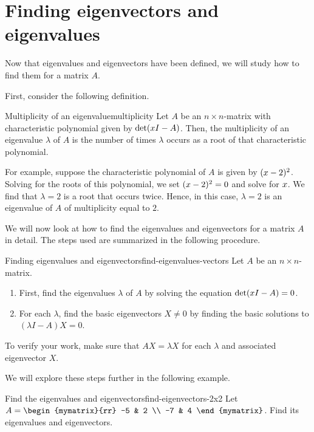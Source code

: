 \section{Finding eigenvectors and eigenvalues}

Now that eigenvalues and eigenvectors have been defined, we will study how to find
 them for a matrix $A$. 

First, consider the following definition.

\begin{definition}{Multiplicity of an eigenvalue}{multiplicity}
Let $A$ be an $n \times n$-matrix with characteristic polynomial given by 
$\det (x I -  A)$. Then, the multiplicity of an eigenvalue $\lambda$ of $A$
is the number of times $\lambda$ occurs as a root of that characteristic polynomial.
\end{definition}

For example, suppose the characteristic polynomial of $A$ is given by
$(x - 2)^2$. Solving for the roots of this
polynomial, we set $(x - 2)^2 = 0$ and solve for
$x$.  We find that $\lambda = 2$ is a root that occurs
twice. Hence, in this case, $\lambda = 2$ is an eigenvalue of $A$ of
multiplicity equal to $2$.

We will now look at how to find the eigenvalues and eigenvectors for a
matrix $A$ in detail.  The steps used are summarized in the following
procedure.

\begin{procedure}{Finding eigenvalues and eigenvectors}{find-eigenvalues-vectors}
%
Let $A$ be an $n \times n$-matrix. 
\begin{enumerate}
\item First, find the eigenvalues $\lambda$ of $A$ by solving the equation $\det (x I -A) = 0$. 

\item For each $\lambda$, find the basic eigenvectors $X \neq 0$ by finding the basic solutions to  $(\lambda I - A) X = 0$.
\end{enumerate}

To verify your work, make sure that $AX=\lambda X$
for each $\lambda$ and associated eigenvector $X$.
\end{procedure}

We will explore these steps further in the following example.

\begin{example}{Find the eigenvalues and eigenvectors}{find-eigenvectors-2x2}
Let $A = \begin{mymatrix}{rr}
-5 & 2 \\
-7 & 4 
\end{mymatrix}$. Find its eigenvalues and eigenvectors. 
\end{example}

